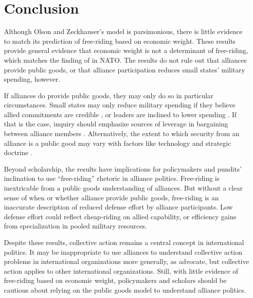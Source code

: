 \documentclass[12pt]{article}
\begin{document}
\section{Conclusion}

Although Olson and Zeckhauser's model is parsimonious, there is little evidence to match its prediction of free-riding based on economic weight. 
These results provide general evidence that economic weight is not a determinant of free-riding, which matches the finding of \citet{PluemperNeumayer2015} in NATO. 
The results do not rule out that alliances provide public goods, or that alliance participation reduces small states' military spending, however. 


If alliances do provide public goods, they may only do so in particular circumstances. 
Small states may only reduce military spending if they believe allied commitments are credible \citep{Goldstein1995, DigiuseppePoast2016}, or leaders are inclined to lower spending \citep{Fuhrmann2020}. 
If that is the case, inquiry should emphasize sources of leverage in bargaining between alliance members \citep{Morrow1991, Norrlof2010, Brooksetal2013, Johnson2015, Kim2016}. 
Alternatively, the extent to which security from an alliance is a public good may vary with factors like technology and strategic doctrine \citep{SandlerHartley2001}. 


Beyond scholarship, the results have implications for policymakers and pundits' inclination to use ``free-riding'' rhetoric in alliance politics. 
Free-riding is inextricable from a public goods understanding of alliances.
But without a clear sense of when or whether alliance provide public goods, free-riding is an inaccurate description of reduced defense effort by alliance participants.  
Low defense effort could reflect cheap-riding on allied capability, or efficiency gains from specialization in pooled military resources. 


Despite these results, collective action remains a central concept in international politics.   
It may be inappropriate to use alliances to understand collective action problems in international organizations more generally, as \citet[pg. 266-7]{OlsonZeckhauser1966} advocate, but collective action applies to other international organizations. 
Still, with little evidence of free-riding based on economic weight, policymakers and scholars should be cautious about relying on the public goods model to understand alliance politics.  



\singlespace


 
\end{document}
